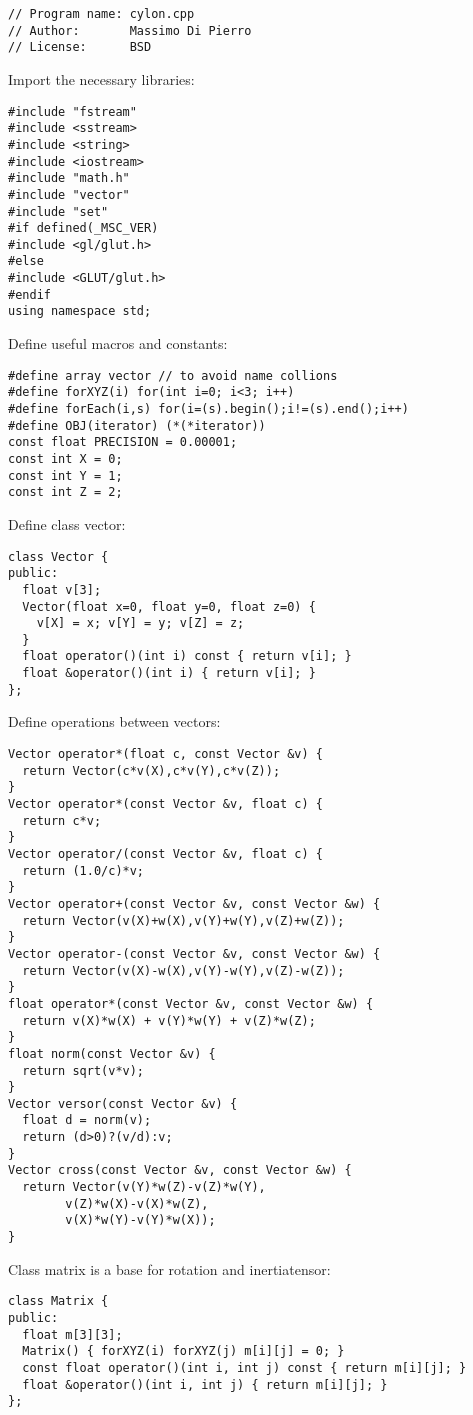 \noindent
\begin{lstlisting}
// Program name: cylon.cpp         
// Author:       Massimo Di Pierro 
// License:      BSD
\end{lstlisting}
\noindent
Import the necessary libraries: \begin{lstlisting}
#include "fstream"
#include <sstream>
#include <string>
#include <iostream>
#include "math.h"
#include "vector"
#include "set"
#if defined(_MSC_VER)
#include <gl/glut.h>
#else
#include <GLUT/glut.h>
#endif
using namespace std;
\end{lstlisting}
\noindent
Define useful macros and constants: \begin{lstlisting}
#define array vector // to avoid name collions
#define forXYZ(i) for(int i=0; i<3; i++)
#define forEach(i,s) for(i=(s).begin();i!=(s).end();i++)
#define OBJ(iterator) (*(*iterator))
const float PRECISION = 0.00001;
const int X = 0;
const int Y = 1;
const int Z = 2;
\end{lstlisting}
\noindent
Define class vector: \begin{lstlisting}
class Vector {
public:
  float v[3];
  Vector(float x=0, float y=0, float z=0) {
    v[X] = x; v[Y] = y; v[Z] = z;
  }
  float operator()(int i) const { return v[i]; }
  float &operator()(int i) { return v[i]; }
};
\end{lstlisting}
\noindent
Define operations between vectors: \begin{lstlisting}
Vector operator*(float c, const Vector &v) {
  return Vector(c*v(X),c*v(Y),c*v(Z));
}
Vector operator*(const Vector &v, float c) {
  return c*v;
}
Vector operator/(const Vector &v, float c) {
  return (1.0/c)*v;
}
Vector operator+(const Vector &v, const Vector &w) {
  return Vector(v(X)+w(X),v(Y)+w(Y),v(Z)+w(Z));
}
Vector operator-(const Vector &v, const Vector &w) {
  return Vector(v(X)-w(X),v(Y)-w(Y),v(Z)-w(Z));
}
float operator*(const Vector &v, const Vector &w) {
  return v(X)*w(X) + v(Y)*w(Y) + v(Z)*w(Z);
}
float norm(const Vector &v) {
  return sqrt(v*v);
}
Vector versor(const Vector &v) {
  float d = norm(v);
  return (d>0)?(v/d):v;
}
Vector cross(const Vector &v, const Vector &w) {
  return Vector(v(Y)*w(Z)-v(Z)*w(Y),
		v(Z)*w(X)-v(X)*w(Z),
		v(X)*w(Y)-v(Y)*w(X));
}
\end{lstlisting}
\noindent
Class matrix is a base for rotation and inertiatensor: \begin{lstlisting}
class Matrix {
public:
  float m[3][3];
  Matrix() { forXYZ(i) forXYZ(j) m[i][j] = 0; }
  const float operator()(int i, int j) const { return m[i][j]; }
  float &operator()(int i, int j) { return m[i][j]; }
};
\end{lstlisting}
